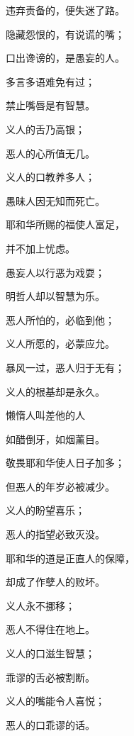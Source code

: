 {\par }{\Q 违弃责备的，便失迷了路。
\par }{\Q {}隐藏怨恨的，有说谎的嘴；
\par }{\Q 口出谗谤的，是愚妄的人。
\par }{\Q {}多言多语难免有过；
\par }{\Q 禁止嘴唇是有智慧。
\par }{\Q {}义人的舌乃{}高银；
\par }{\Q 恶人的心所值无几。
\par }{\Q {}义人的口教养多人；
\par }{\Q 愚昧人因无知而死亡。
\par }{\Q {}耶和华所赐的福使人富足，
\par }{\Q 并不加上忧虑。
\par }{\Q {}愚妄人以行恶为戏耍；
\par }{\Q 明哲人却以智慧为乐。
\par }{\Q {}恶人所怕的，必临到他；
\par }{\Q 义人所愿的，必蒙应允。
\par }{\Q {}暴风一过，恶人归于无有；
\par }{\Q 义人的根基却是永久。
\par }{\Q {}懒惰人叫差他的人
\par }{\Q 如醋倒牙，如烟薰目。
\par }{\Q {}敬畏耶和华使人日子加多；
\par }{\Q 但恶人的年岁必被减少。
\par }{\Q {}义人的盼望{}喜乐；
\par }{\Q 恶人的指望必致灭没。
\par }{\Q {}耶和华的道是正直人的保障，
\par }{\Q 却成了作孽人的败坏。
\par }{\Q {}义人永不挪移；
\par }{\Q 恶人不得住在地上。
\par }{\Q {}义人的口滋生智慧；
\par }{\Q 乖谬的舌必被割断。
\par }{\Q {}义人的嘴能令人喜悦；
\par }{\Q 恶人的口{}乖谬的话。

}
